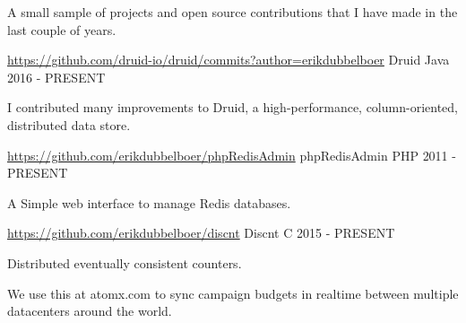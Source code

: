 
\begin{cvparagraph}
	A small sample of projects and open source contributions that I have made in the last couple of years.
\end{cvparagraph}

\begin{cventries}

  \cventry
    {\href{https://github.com/druid-io/druid/commits?author=erikdubbelboer}{\textcolor{link}{https://github.com/druid-io/druid/commits?author=erikdubbelboer}}} %
    {Druid} %
    {Java} %
    {2016 - PRESENT} %
    {
      \begin{cvitems} %
				\item{I contributed many improvements to Druid, a high-performance, column-oriented, distributed data store.}
      \end{cvitems}
    }

  \cventry
    {\href{https://github.com/erikdubbelboer/phpRedisAdmin}{\textcolor{link}{https://github.com/erikdubbelboer/phpRedisAdmin}}} %
    {phpRedisAdmin} %
    {PHP} %
    {2011 - PRESENT} %
    {
      \begin{cvitems} %
				\item{A Simple web interface to manage Redis databases.}
      \end{cvitems}
    }

  \cventry
    {\href{https://github.com/erikdubbelboer/discnt}{\textcolor{link}{https://github.com/erikdubbelboer/discnt}}} %
    {Discnt} %
    {C} %
    {2015 - PRESENT} %
    {
      \begin{cvitems} %
				\item{Distributed eventually consistent counters.}
				\item{We use this at atomx.com to sync campaign budgets in realtime between multiple datacenters around the world.}
      \end{cvitems}
    }


\end{cventries}
